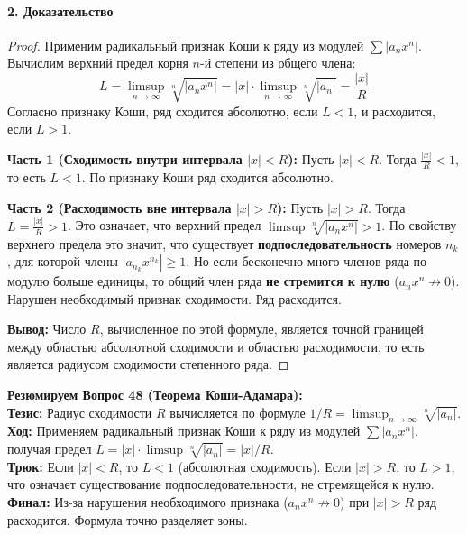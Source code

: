 \paragraph{2. Доказательство}
\begin{proof}
Применим радикальный признак Коши к ряду из модулей $\sum |a_n x^n|$. Вычислим верхний предел корня $n$-й степени из общего члена:
$$ L = \limsup_{n \to \infty} \sqrt[n]{|a_n x^n|} = |x| \cdot \limsup_{n \to \infty} \sqrt[n]{|a_n|} = \frac{|x|}{R} $$
Согласно признаку Коши, ряд сходится абсолютно, если $L < 1$, и расходится, если $L > 1$.

\textbf{Часть 1 (Сходимость внутри интервала $|x| < R$):}
Пусть $|x| < R$. Тогда $\frac{|x|}{R} < 1$, то есть $L < 1$. По признаку Коши ряд сходится абсолютно.

\textbf{Часть 2 (Расходимость вне интервала $|x| > R$):}
Пусть $|x| > R$. Тогда $L = \frac{|x|}{R} > 1$. Это означает, что верхний предел $\limsup \sqrt[n]{|a_n x^n|} > 1$.
По свойству верхнего предела это значит, что существует \textbf{подпоследовательность} номеров $n_k$, для которой члены $|a_{n_k} x^{n_k}| \ge 1$. 
Но если бесконечно много членов ряда по модулю больше единицы, то общий член ряда \textbf{не стремится к нулю} ($a_n x^n \not\to 0$). Нарушен необходимый признак сходимости. Ряд расходится.

\textbf{Вывод:} Число $R$, вычисленное по этой формуле, является точной границей между областью абсолютной сходимости и областью расходимости, то есть является радиусом сходимости степенного ряда.
\end{proof}
\begin{tcolorbox}[colback=gray!5, colframe=black, boxrule=0.5pt, arc=0pt]
\textbf{Резюмируем Вопрос 48 (Теорема Коши-Адамара):} \\
\textbf{Тезис:} Радиус сходимости $R$ вычисляется по формуле $1/R = \limsup_{n \to \infty} \sqrt[n]{|a_n|}$. \\
\textbf{Ход:} Применяем радикальный признак Коши к ряду из модулей $\sum |a_n x^n|$, получая предел $L = |x| \cdot \limsup \sqrt[n]{|a_n|} = |x|/R$. \\
\textbf{Трюк:} Если $|x| < R$, то $L < 1$ (абсолютная сходимость). Если $|x| > R$, то $L > 1$, что означает существование подпоследовательности, не стремящейся к нулю. \\
\textbf{Финал:} Из-за нарушения необходимого признака ($a_n x^n \not\to 0$) при $|x| > R$ ряд расходится. Формула точно разделяет зоны.
\end{tcolorbox}




